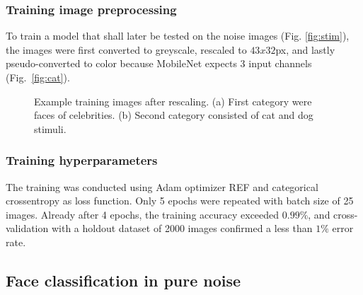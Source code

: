 \documentclass[10pt,a4paper,twocolumn]{article}
\begin{document}
\subsubsection{Training image preprocessing}

To train a model that shall later be tested on the noise images (Fig. \ref{fig:stim}), the images were first converted to greyscale, rescaled to $43x32$px, and lastly pseudo-converted to color because MobileNet expects 3 input channels (Fig.~\ref{fig:cat}).

\begin{figure}
    \centering
    \qquad
    \caption{Example training images after rescaling. (a) First category were faces of celebrities. (b) Second category consisted of cat and dog stimuli.}
    \label{fig:train}
\end{figure}

\subsubsection{Training hyperparameters}

The training was conducted using Adam optimizer REF and categorical crossentropy as loss function. Only 5 epochs were repeated with batch size of 25 images. Already after 4 epochs, the training accuracy exceeded $0.99\%$, and cross-validation with a holdout dataset of 2000 images confirmed a less than $1\%$ error rate.

\subsection{Face classification in pure noise}
\end{document}
